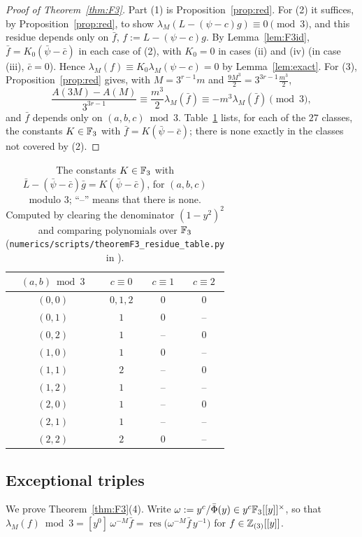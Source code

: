 \documentclass[11pt]{amsart}
\begin{document}
\begin{proof}[Proof of Theorem~\ref{thm:F3}]
Part (1) is Proposition~\ref{prop:red}. For (2) it suffices, by Proposition~\ref{prop:red}, to show $\lambda_M(L-(\psi-c)g)\equiv0\pmod3$, and this residue depends only on $\bar f$, $f:=L-(\psi-c)g$. By Lemma~\ref{lem:F3id}, $\bar f=K_0(\bar\psi-\bar c)$ in each case of (2), with $K_0=0$ in cases (ii) and (iv) (in case (iii), $\bar c=0$). Hence $\lambda_M(f)\equiv K_0\lambda_M(\psi-c)=0$ by Lemma~\ref{lem:exact}. For (3), Proposition~\ref{prop:red} gives, with $M=3^{r-1}m$ and $\frac{9M^3}2=3^{3r-1}\frac{m^3}2$,
\[ \frac{A(3M)-A(M)}{3^{3r-1}}\equiv\frac{m^3}2\lambda_M(\bar f)\equiv-m^3\lambda_M(\bar f)\pmod3, \]
and $\bar f$ depends only on $(a,b,c)\bmod3$. Table~\ref{tab:F3} lists, for each of the $27$ classes, the constants $K\in\mathbb{F}_3$ with $\bar f=K(\bar\psi-\bar c)$; there is none exactly in the classes not covered by (2).
\end{proof}

\begin{table}[ht]
\centering
\caption{The constants $K\in\mathbb{F}_3$ with $\bar L-(\bar\psi-\bar c)\bar g=K(\bar\psi-\bar c)$, for $(a,b,c)$ modulo $3$; ``--'' means that there is none. Computed by clearing the denominator $(1-y^2)^2$ and comparing polynomials over $\mathbb{F}_3$ (\texttt{numerics/scripts/theoremF3\_residue\_table.py} in \cite{repo}).}\label{tab:F3}
\begin{tabular}{@{}cccc@{}}
\toprule
$(a,b)\bmod3$ & $c\equiv0$ & $c\equiv1$ & $c\equiv2$\\
\midrule
$(0,0)$ & $0,1,2$ & $0$ & $0$\\
$(0,1)$ & $1$ & $0$ & --\\
$(0,2)$ & $1$ & -- & $0$\\
$(1,0)$ & $1$ & $0$ & --\\
$(1,1)$ & $2$ & -- & $0$\\
$(1,2)$ & $1$ & -- & --\\
$(2,0)$ & $1$ & -- & $0$\\
$(2,1)$ & $1$ & -- & --\\
$(2,2)$ & $2$ & $0$ & --\\
\bottomrule
\end{tabular}
\end{table}

\subsection{Exceptional triples}\label{sec:exceptional}
We prove Theorem~\ref{thm:F3}(4). Write $\omega:=y^c/\bar\Phi(y)\in y^c\mathbb{F}_3[[y]]^\times$, so that $\lambda_M(f)\bmod3=[y^0]\,\omega^{-M}\bar f=\operatorname{res}\bigl(\omega^{-M}\bar f\,y^{-1}\bigr)$ for $f\in\mathbb{Z}_{(3)}[[y]]$.
\end{document}

